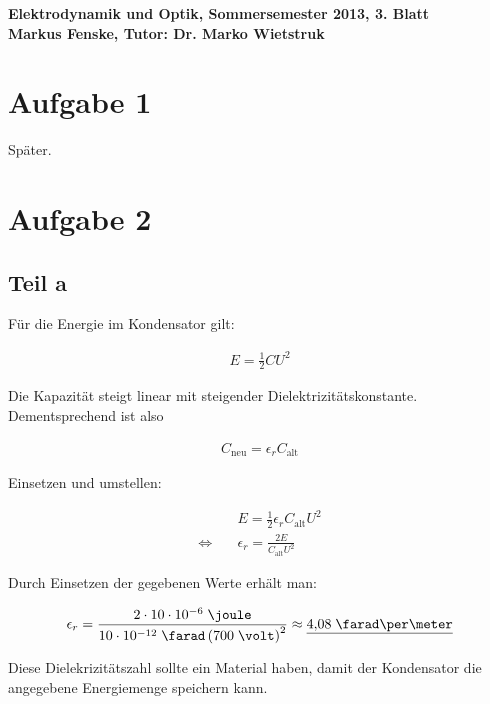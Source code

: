 \documentclass[a4paper,german,12pt,smallheadings]{scrartcl}
\begin{document}
\begin{center}
\bfseries %
\sffamily %
\vspace{-40pt}
Elektrodynamik und Optik, Sommersemester 2013, 3. Blatt \\
Markus Fenske, Tutor: Dr. Marko Wietstruk
\vspace{-10pt}
\end{center}
\section*{Aufgabe 1}

Später.

\section*{Aufgabe 2}
\subsection*{Teil a}

Für die Energie im Kondensator gilt:

\begin{align*}
  E = \frac{1}{2} C U^2
\end{align*}

Die Kapazität steigt linear mit steigender Dielektrizitätskonstante. Dementsprechend ist also

\begin{align*}
  C_{\text{neu}} = \epsilon_r C_\text{alt}
\end{align*}

Einsetzen und umstellen:

\begin{align*}
  &E = \frac{1}{2} \epsilon_r C_\text{alt} U^2 \\
  \Leftrightarrow \quad &\epsilon_r = \frac{2E}{C_\text{alt} U^2}
\end{align*}

Durch Einsetzen der gegebenen Werte erhält man:

\begin{align*}
  \epsilon_r = \frac{2 \cdot 10 \cdot 10^{-6}\;\joule}{10 \cdot 10^{-12}\; \farad \left(700\; \volt\right)^2} \approx \underline{4{,}08\; \farad\per\meter}
\end{align*}

Diese Dielekrizitätszahl sollte ein Material haben, damit der Kondensator die
angegebene Energiemenge speichern kann.
\end{document}
